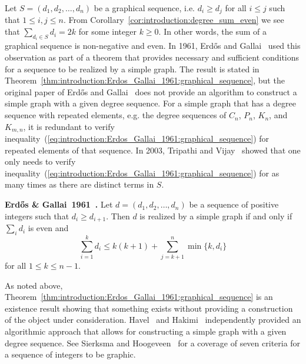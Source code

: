 Let $S = (d_1, d_2, \dots, d_n)$ be a graphical sequence, i.e.
$d_i \geq d_j$ for all $i \leq j$ such that $1 \leq i, j \leq n$. From
Corollary~\ref{cor:introduction:degree_sum_even} we see that
$\sum_{d_i \in S} d_i = 2k$ for some integer $k \geq 0$. In other
words, the sum of a graphical sequence is non-negative and
even. In 1961, Erd\H{o}s and Gallai~\cite{ErdosGallai1961} used this
observation as part of a theorem that provides necessary and
sufficient conditions for a sequence to be realized by a simple
graph. The result is stated in
Theorem~\ref{thm:introduction:Erdos_Gallai_1961:graphical_sequence},
but the original paper of Erd\H{o}s and Gallai~\cite{ErdosGallai1961}
does not provide an algorithm to construct a simple graph with a given
degree sequence. For a simple graph that has a degree sequence with
repeated elements, e.g. the degree sequences of $C_n$, $P_n$, $K_n$,
and $K_{m,n}$, it is redundant to verify
inequality~(\ref{eq:introduction:Erdos_Gallai_1961:graphical_sequence})
for repeated elements of that sequence. In 2003, Tripathi and
Vijay~\cite{TripathiVijay2003} showed that one only needs to verify
inequality~(\ref{eq:introduction:Erdos_Gallai_1961:graphical_sequence})
for as many times as there are distinct terms in $S$.

\begin{theorem}
\label{thm:introduction:Erdos_Gallai_1961:graphical_sequence}
\textbf{Erd\H{o}s \& Gallai~1961~\cite{ErdosGallai1961}.}
Let $d = (d_1, d_2, \dots, d_n)$ be a sequence of positive integers
such that $d_i \geq d_{i+1}$. Then $d$ is realized by a simple graph
if and only if $\sum_i d_i$ is even and
%
\begin{equation}
\label{eq:introduction:Erdos_Gallai_1961:graphical_sequence}
\sum_{i=1}^k d_i
\leq
k(k + 1) + \sum_{j=k+1}^n \min\{k, d_i\}
\end{equation}
%
for all $1 \leq k \leq n - 1$.
\end{theorem}

As noted above,
Theorem~\ref{thm:introduction:Erdos_Gallai_1961:graphical_sequence} is
an existence result showing that something exists without providing a
construction of the object under consideration. Havel~\cite{Havel1955}
and Hakimi~\cite{Hakimi1962,Hakimi1963} independently provided an
algorithmic approach that allows for constructing a simple graph with
a given degree sequence. See Sierksma and
Hoogeveen~\cite{SierksmaHoogeveen1991} for a coverage of seven
criteria for a sequence of integers to be graphic.

